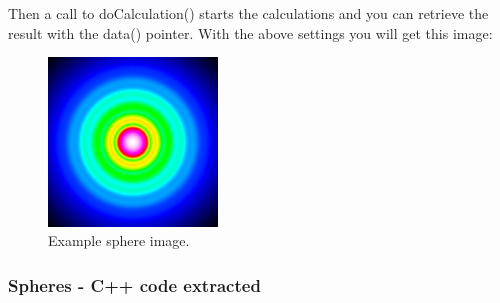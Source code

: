 \documentclass[11pt]{article} %
\begin{document}
Then a call to doCalculation() starts the calculations and you can retrieve the result with the data() pointer. With the above settings you will get this image:
\begin{figure}[H]
 \centering
 \includegraphics[width=0.4\textwidth]{Vitess-Sphere.png}
 \caption{Example sphere image.}
\end{figure}

\clearpage
\subsubsection{Spheres - C++ code extracted}
\end{document}
